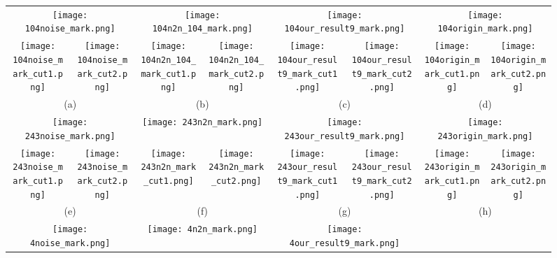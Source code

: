 \documentclass[journal]{IEEEtran}
\begin{document}
\begin{figure*}
  \centering
  \small
  \setlength\tabcolsep{0.05pt}
  \begin{tabular}{cccccccc}
  \multicolumn{2}{c}{\texttt{[image: 104noise\_mark.png]}} &
  \multicolumn{2}{c}{\texttt{[image: 104n2n\_104\_mark.png]}} &
  \multicolumn{2}{c}{\texttt{[image: 104our\_result9\_mark.png]}} &
  \multicolumn{2}{c}{\texttt{[image: 104origin\_mark.png]}} \\
  \texttt{[image: 104noise\_mark\_cut1.png]} &
  \texttt{[image: 104noise\_mark\_cut2.png]} &
  \texttt{[image: 104n2n\_104\_mark\_cut1.png]} &
  \texttt{[image: 104n2n\_104\_mark\_cut2.png]} &
  \texttt{[image: 104our\_result9\_mark\_cut1.png]} &
  \texttt{[image: 104our\_result9\_mark\_cut2.png]} &
  \texttt{[image: 104origin\_mark\_cut1.png]} &
  \texttt{[image: 104origin\_mark\_cut2.png]} \\
  \multicolumn{2}{c}{(a)} &
  \multicolumn{2}{c}{(b)} &
  \multicolumn{2}{c}{(c)} &
  \multicolumn{2}{c}{(d)} \\
  \multicolumn{2}{c}{\texttt{[image: 243noise\_mark.png]}} &
  \multicolumn{2}{c}{\texttt{[image: 243n2n\_mark.png]}} &
  \multicolumn{2}{c}{\texttt{[image: 243our\_result9\_mark.png]}} &
  \multicolumn{2}{c}{\texttt{[image: 243origin\_mark.png]}} \\
  \texttt{[image: 243noise\_mark\_cut1.png]} &
  \texttt{[image: 243noise\_mark\_cut2.png]} &
  \texttt{[image: 243n2n\_mark\_cut1.png]} &
  \texttt{[image: 243n2n\_mark\_cut2.png]} &
  \texttt{[image: 243our\_result9\_mark\_cut1.png]} &
  \texttt{[image: 243our\_result9\_mark\_cut2.png]} &
  \texttt{[image: 243origin\_mark\_cut1.png]} &
  \texttt{[image: 243origin\_mark\_cut2.png]} \\
  \multicolumn{2}{c}{(e)} &
  \multicolumn{2}{c}{(f)} &
  \multicolumn{2}{c}{(g)} &
  \multicolumn{2}{c}{(h)} \\
  \multicolumn{2}{c}{\texttt{[image: 4noise\_mark.png]}} &
  \multicolumn{2}{c}{\texttt{[image: 4n2n\_mark.png]}} &
  \multicolumn{2}{c}{\texttt{[image: 4our\_result9\_mark.png]}} &

\end{tabular}
\end{figure*}
\end{document}
